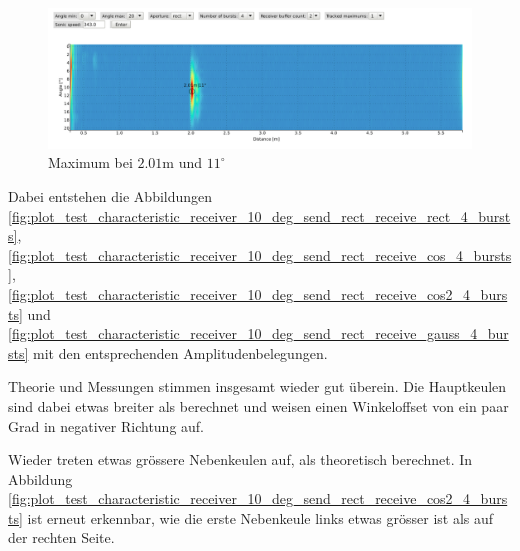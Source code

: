 \begin{figure}[htb]
\includegraphics[width=\textwidth]{graphics/image_test_characteristic_receiver_10_deg_send.png}
\caption{Maximum bei $2.01 \mathrm{m}$ und $11^{\circ}$} %
\label{fig:image_test_characteristic_receiver_10_deg_send}
\end{figure}
%

Dabei entstehen die Abbildungen \ref{fig:plot_test_characteristic_receiver_10_deg_send_rect_receive_rect_4_bursts}, \ref{fig:plot_test_characteristic_receiver_10_deg_send_rect_receive_cos_4_bursts}, \ref{fig:plot_test_characteristic_receiver_10_deg_send_rect_receive_cos2_4_bursts} und \ref{fig:plot_test_characteristic_receiver_10_deg_send_rect_receive_gauss_4_bursts} mit den entsprechenden Amplitudenbelegungen.

Theorie und Messungen stimmen insgesamt wieder gut überein. Die Hauptkeulen sind dabei etwas breiter als berechnet und weisen einen Winkeloffset von ein paar Grad in negativer Richtung auf.

Wieder treten etwas grössere Nebenkeulen auf, als theoretisch berechnet. In Abbildung \ref{fig:plot_test_characteristic_receiver_10_deg_send_rect_receive_cos2_4_bursts} ist erneut erkennbar, wie die erste Nebenkeule links etwas grösser ist als auf der rechten Seite.

